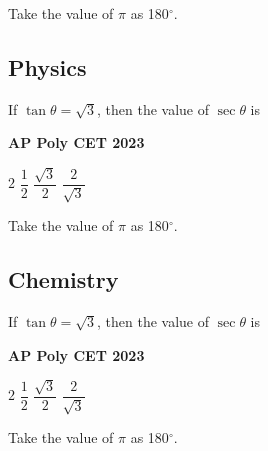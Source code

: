 \documentclass[11pt,paper=a4,answers]{exam}
\begin{document}
\begin{center}
  \Large{Take the value of $\pi$ as 180${^\circ}$.}
\end{center}

\newpage



\subsection*{Physics}
\begin{multicols}{2}
\begin{questions}
\question
If $\tan  \theta = \sqrt{3}$, then the value of $\sec \theta$ is
\begin{flushright}
\small\textbf{AP Poly CET 2023}
\end{flushright}


\begin{choices}
\choice $\displaystyle 2$ 
\choice $\displaystyle \dfrac{1}{2}$ 
\choice $\displaystyle \dfrac{\sqrt{3}}{2}$ 
\choice $\displaystyle \dfrac{2}{\sqrt{3}}$  
\end{choices}
\end{questions}

\end{multicols}

\begin{center}
\Large{Take the value of $\pi$ as 180${^\circ}$.}
\end{center}

\newpage















\subsection*{Chemistry}
\begin{multicols}{2}
\begin{questions}
\question
If $\tan  \theta = \sqrt{3}$, then the value of $\sec \theta$ is
\begin{flushright}
\small\textbf{AP Poly CET 2023}
\end{flushright}


\begin{choices}
\choice $\displaystyle 2$ 
\choice $\displaystyle \dfrac{1}{2}$ 
\choice $\displaystyle \dfrac{\sqrt{3}}{2}$ 
\choice $\displaystyle \dfrac{2}{\sqrt{3}}$  
\end{choices}
\end{questions}

\end{multicols}

\begin{center}
\Large{Take the value of $\pi$ as 180${^\circ}$.}
\end{center}

\newpage
\end{document}
